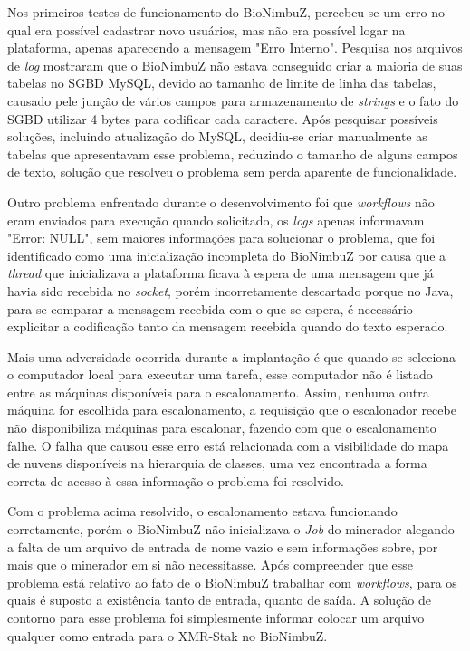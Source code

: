 Nos primeiros testes de funcionamento do BioNimbuZ, percebeu-se um erro no qual era possível cadastrar novo usuários, mas não era possível logar na plataforma, apenas aparecendo a mensagem "Erro Interno". Pesquisa nos arquivos de \textit{log} mostraram que o BioNimbuZ não estava conseguido criar a maioria de suas tabelas no \acrfull{SGBD} MySQL, devido ao tamanho de limite de linha das tabelas, causado pele junção de vários campos para armazenamento de \textit{strings} e o fato do \acrshort{SGBD} utilizar 4 bytes para codificar cada caractere. Após pesquisar possíveis soluções, incluindo atualização do MySQL, decidiu-se criar manualmente as tabelas que apresentavam esse problema, reduzindo o tamanho de alguns campos de texto, solução que resolveu o problema sem perda aparente de funcionalidade.

Outro problema enfrentado durante o desenvolvimento foi que \textit{workflows} não eram enviados para execução quando solicitado, os \textit{logs} apenas informavam "Error: NULL", sem maiores informações para solucionar o problema, que foi identificado como uma inicialização incompleta do BioNimbuZ por causa que a \textit{thread} que inicializava a plataforma ficava à espera de uma mensagem que já havia sido recebida no \textit{socket}, porém incorretamente descartado porque no Java, para se comparar a mensagem recebida com o que se espera, é necessário explicitar a codificação tanto da mensagem recebida quando do texto esperado.

Mais uma adversidade ocorrida durante a implantação é que quando se seleciona o computador local para executar uma tarefa, esse computador não é listado entre as máquinas disponíveis para o escalonamento. Assim, nenhuma outra máquina for escolhida para escalonamento, a requisição que o escalonador recebe não disponibiliza máquinas para escalonar, fazendo com que o escalonamento falhe. O falha que causou esse erro está relacionada com a visibilidade do mapa de nuvens disponíveis na hierarquia de classes, uma vez encontrada a forma correta de acesso à essa informação o problema foi resolvido.

Com o problema acima resolvido, o escalonamento estava funcionando corretamente, porém o BioNimbuZ não inicializava o \textit{Job} do minerador alegando a falta de um arquivo de entrada de nome vazio e sem informações sobre, por mais que o minerador em si não necessitasse. Após compreender que esse problema está relativo ao fato de o BioNimbuZ trabalhar com \textit{workflows}, para os quais é suposto a existência tanto de entrada, quanto de saída. A solução de contorno para esse problema foi simplesmente informar colocar um arquivo qualquer como entrada para o XMR-Stak no BioNimbuZ.

